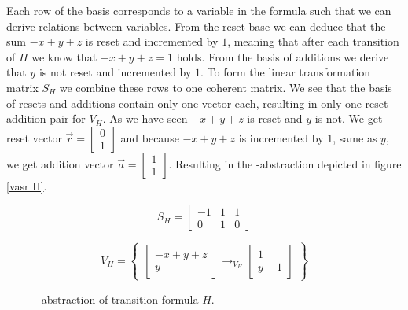 Each row of the basis corresponds to a variable in the formula such that we can derive relations between variables. From the reset base we can deduce that the sum $-x + y + z$ is reset and incremented by $1$, meaning that after each transition of $H$ we know that $-x + y + z = 1$ holds. From the basis of additions we derive that $y$ is not reset and incremented by $1$. To form the linear transformation matrix $S_H$ we combine these rows to one coherent matrix. We see that the basis of resets and additions contain only one vector each, resulting in only one reset addition pair for $V_H$. As we have seen $-x + y + z$ is reset and $y$ is not. We get reset vector $\vec{r} = \begin{bmatrix} 0 \\ 1 \end{bmatrix}$ and because $-x + y + z$ is incremented by $1$, same as $y$, we get addition vector $\vec{a} = \begin{bmatrix} 1 \\ 1 \end{bmatrix}$. Resulting in the \qvasr-abstraction depicted in figure \ref{vasr  H}.
\vspace*{-2em}
\begin{figure}[H]
	\begin{center}
		\begin{minipage}{0.3\linewidth}
			\begin{equation*}
				S_H = \begin{bmatrix} -1 & 1 & 1 \\ 0 & 1 & 0 \end{bmatrix}
			\end{equation*}
		\end{minipage}
		\begin{minipage}{0.6\linewidth}
			\begin{equation*}
				V_H = \begin{Bmatrix} \begin{bmatrix} - x + y + z \\ y \end{bmatrix} \rightarrow_{V_H} \begin{bmatrix}	1 \\ y + 1 \end{bmatrix} \end{Bmatrix}
			\end{equation*}
		\end{minipage}
	\caption{\qvasr-abstraction of transition formula $H$.}
	\label{vasr H}
	\end{center}
\end{figure}
